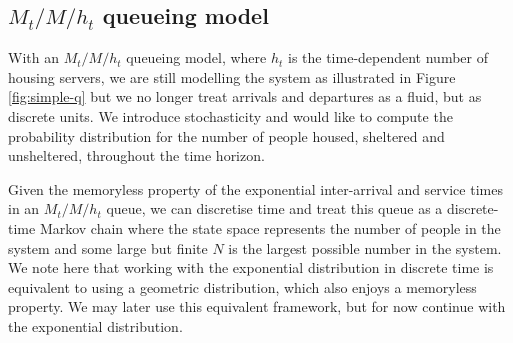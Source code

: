 \documentclass[12pt,a4paper]{article}
\begin{document}
\subsection{$M_t/M/h_t$ queueing model}
%
With an $M_t/M/h_t$ queueing model, where $h_t$ is the time-dependent number of housing servers, we are still modelling the system as illustrated in Figure \ref{fig:simple-q} but we no longer treat arrivals and departures as a fluid, but as discrete units. We introduce stochasticity and would like to compute the probability distribution for the number of people housed, sheltered and unsheltered, throughout the time horizon. 

Given the memoryless property of the exponential inter-arrival and service times in an $M_t/M/h_t$ queue, we can discretise time and treat this queue as a discrete-time Markov chain where the state space represents the number of people in the system and some large but finite $N$ is the largest possible number in the system. We note here that working with the exponential distribution in discrete time is equivalent to using a geometric distribution, which also enjoys a memoryless property. We may later use this equivalent framework, but for now continue with the exponential distribution.
\end{document}
